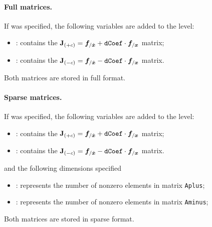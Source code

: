 \paragraph{Full matrices.}
If  was specified, the following variables are added to the
 level:
\begin{itemize}
\item {} : contains the 
    $\bm{\mathbf J}_{(+c)} = \boldsymbol{f}_{/\dot{\boldsymbol{x}}} + \texttt{dCoef} \cdot \boldsymbol{f}_{/\boldsymbol{x}}$ 
    matrix;
\item {} : contains the
    $\bm{\mathbf J}_{(-c)} = \boldsymbol{f}_{/\dot{\boldsymbol{x}}} - \texttt{dCoef} \cdot \boldsymbol{f}_{/\boldsymbol{x}}$ 
    matrix.
\end{itemize}
Both matrices are stored in full format.

\paragraph{Sparse matrices.}
If  was specified, the following variables are added to the
 level:
\begin{itemize}
\item {} : contains the 
    $\bm{\mathbf J}_{(+c)} = \boldsymbol{f}_{/\dot{\boldsymbol{x}}} + \texttt{dCoef} \cdot \boldsymbol{f}_{/\boldsymbol{x}}$ 
    matrix;
\item {} : contains the
    $\bm{\mathbf J}_{(-c)} = \boldsymbol{f}_{/\dot{\boldsymbol{x}}} - \texttt{dCoef} \cdot \boldsymbol{f}_{/\boldsymbol{x}}$ 
    matrix.
\end{itemize}
and the following dimensions specified
\begin{itemize}
\item {} : 
    represents the number of nonzero elements in matrix \texttt{Aplus};
\item {} : 
    represents the number of nonzero elements in matrix \texttt{Aminus};
\end{itemize}
Both matrices are stored in sparse format.

